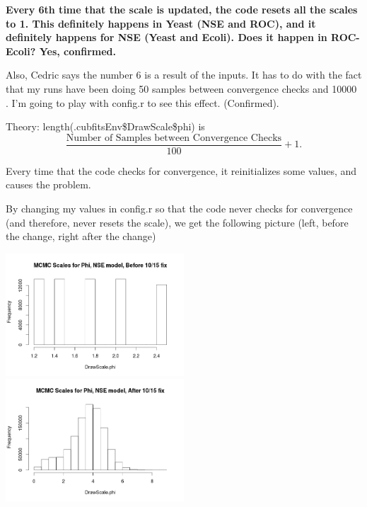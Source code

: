 \textbf{Every 6th time that the scale is updated, the code resets all the scales to 1. This definitely happens in Yeast (NSE and ROC), and it definitely happens for NSE (Yeast and Ecoli). Does it happen in ROC-Ecoli? Yes, confirmed.}

Also, Cedric says the number 6 is a result of the inputs. It has to do with the fact that my runs have been doing 50 samples between convergence checks and 10000 . I'm going to play with config.r to see this effect. (Confirmed).

Theory: length(.cubfitsEnv\$DrawScale\$phi) is $$\frac{\mbox{Number of Samples between Convergence Checks}}{100} + 1.$$

Every time that the code checks for convergence, it reinitializes some values, and causes the problem.

By changing my values in config.r so that the code never checks for convergence (and therefore, never resets the scale), we get the following picture (left, before the change, right after the change)

\includegraphics[width=0.5\textwidth]{data/oct15-phiscales-before_change.png}
\includegraphics[width=0.5\textwidth]{data/oct15-phiscales-after_change.png}

